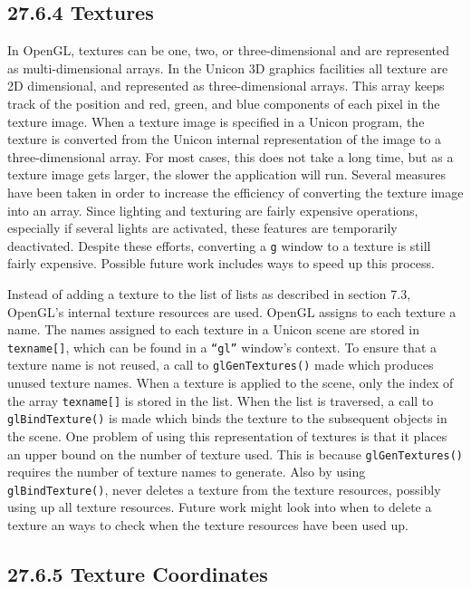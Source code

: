 \subsection[27.6.4 Textures]{27.6.4 Textures}

In OpenGL, textures can be one, two, or three-dimensional and are
represented as multi-dimensional arrays. In the Unicon 3D graphics
facilities all texture are 2D dimensional, and represented as
three-dimensional arrays. This array keeps track of the position and
red, green, and blue components of each pixel in the texture
image. When a texture image is specified in a Unicon program, the
texture is converted from the Unicon internal representation of the
image to a three-dimensional array. For most cases, this does not take
a long time, but as a texture image gets larger, the slower the
application will run. Several measures have been taken in order to
increase the efficiency of converting the texture image into an
array. Since lighting and texturing are fairly expensive operations,
especially if several lights are activated, these features are
temporarily deactivated. Despite these efforts, converting a
{\textquotedbl}\texttt{g{\textquotedbl}} window to a texture is still
fairly expensive. Possible future work includes ways to speed up this
process.

Instead of adding a texture to the list of lists as described in
section 7.3, OpenGL's internal texture resources are used. OpenGL
assigns to each texture a name. The names assigned to each texture in
a Unicon scene are stored in \texttt{texname[]}, which can be found in
a \texttt{``gl''} window's context. To ensure that a texture name is
not reused, a call to \texttt{glGenTextures()} made which produces
unused texture names. When a texture is applied to the scene, only the
index of the array \texttt{texname[]} is stored in the list. When the
list is traversed, a call to \texttt{glBindTexture()} is made which
binds the texture to the subsequent objects in the scene. One problem
of using this representation of textures is that it places an upper
bound on the number of texture used. This is because
\texttt{glGenTextures()} requires the number of texture names to
generate. Also by using \texttt{glBindTexture()}, never deletes a
texture from the texture resources, possibly using up all texture
resources. Future work might look into when to delete a texture an
ways to check when the texture resources have been used up.

\subsection[27.6.5 Texture Coordinates]{27.6.5 Texture Coordinates}


